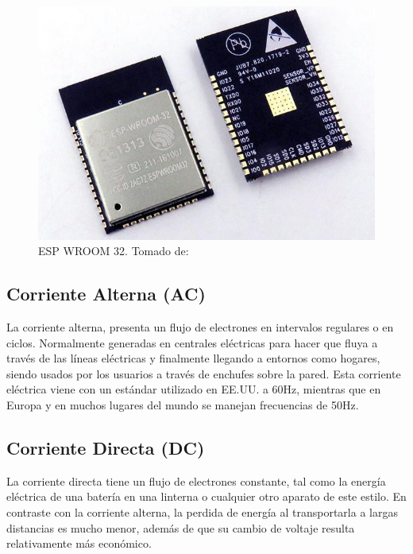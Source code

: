 \begin{figure}[H]
	\centering
	\caption[ESP WROOM 32.]{ESP WROOM 32. Tomado de: \cite{ESPIMG}}
	\label{fig:esp32-wroom-s32-00}
	\includegraphics{Imagenes/esp32-wroom-s32-00}
\end{figure}

\subsection{Corriente Alterna (AC)}

La corriente alterna, presenta un flujo de electrones en intervalos regulares o en ciclos. Normalmente generadas en centrales eléctricas para hacer que fluya a través de las líneas eléctricas y finalmente llegando a entornos como hogares, siendo usados por los usuarios a través de enchufes sobre la pared. Esta corriente eléctrica viene con un estándar utilizado en EE.UU. a 60Hz, mientras que en Europa y en muchos lugares del mundo se manejan frecuencias de 50Hz. \cite{Cor}

\subsection{Corriente Directa (DC)}

La corriente directa tiene un flujo de electrones constante, tal como la energía eléctrica de una batería en una linterna o cualquier otro aparato de este estilo. En contraste con la corriente alterna, la perdida de energía al transportarla a largas distancias es mucho menor, además de que su cambio de voltaje resulta relativamente más económico. \cite{Cor}\\

